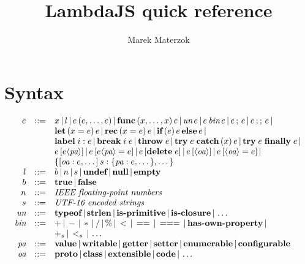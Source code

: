 \documentclass[draft]{article}
\title{LambdaJS quick reference}
\author{Marek Materzok}
\newcommand{\expr}[0]{e}
\newcommand{\var}[0]{x}
\newcommand{\lit}[0]{l}
\newcommand{\bool}[0]{b}
\newcommand{\num}[0]{n}
\newcommand{\str}[0]{s}
\newcommand{\id}[0]{i}
\newcommand{\undef}[0]{\textbf{undef}}
\newcommand{\nul}[0]{\textbf{null}}
\newcommand{\empt}[0]{\textbf{empty}}
\newcommand{\true}[0]{\textbf{true}}
\newcommand{\false}[0]{\textbf{false}}
\newcommand{\unop}[0]{\textit{un}}
\newcommand{\binop}[0]{\textit{bin}}
\newcommand{\pattr}[0]{\textit{pa}}
\newcommand{\oattr}[0]{\textit{oa}}
\newcommand{\pavalue}[0]{\textbf{value}}
\newcommand{\pawritable}[0]{\textbf{writable}}
\newcommand{\paget}[0]{\textbf{getter}}
\newcommand{\paset}[0]{\textbf{setter}}
\newcommand{\paenum}[0]{\textbf{enumerable}}
\newcommand{\paconfig}[0]{\textbf{configurable}}
\newcommand{\oaproto}[0]{\textbf{proto}}
\newcommand{\oaclass}[0]{\textbf{class}}
\newcommand{\oaextens}[0]{\textbf{extensible}}
\newcommand{\oacode}[0]{\textbf{code}}
\newcommand{\unap}[1]{\unop \thinspace #1}
\newcommand{\binap}[2]{#1 \thinspace \binop \thinspace #2}
\newcommand{\ap}[2]{#1\thinspace(#2)}
\newcommand{\func}[2]{\textbf{func}\thinspace(#1)\thinspace #2}
\newcommand{\seq}[2]{#1 \thinspace ; \thinspace #2}
\newcommand{\jseq}[2]{#1 \thinspace ;; \thinspace #2}
\newcommand{\letdef}[3]{\textbf{let} \thinspace (#1 = #2) \thinspace #3}
\newcommand{\recdef}[3]{\textbf{rec} \thinspace (#1 = #2) \thinspace #3}
\newcommand{\ife}[3]{\textbf{if} \thinspace (#1) \thinspace #2 \thinspace \textbf{else} \thinspace #3}
\newcommand{\lbl}[2]{\textbf{label} \thickspace #1: #2}
\newcommand{\brk}[2]{\textbf{break} \thickspace #1 \thickspace #2}
\newcommand{\throw}[1]{\textbf{throw} \thickspace #1}
\newcommand{\trycatch}[3]{\textbf{try} \thickspace #1 \thickspace \textbf{catch}\thinspace(#2) \thinspace #3}
\newcommand{\tryfin}[2]{\textbf{try} \thickspace #1 \thickspace \textbf{finally} \thickspace #2}
\newcommand{\getattr}[3]{#2 \thinspace [ #3 \langle #1 \rangle ] }
\newcommand{\setattr}[4]{#2 \thinspace [ #3 \langle #1 \rangle = #4 ] }
\newcommand{\delattr}[2]{#1 \thinspace [ \textbf{delete} \thickspace #2 ]}
\newcommand{\getoattr}[2]{#2 \thinspace [ \langle #1 \rangle ]}
\newcommand{\setoattr}[3]{#2 \thinspace [ \langle #1 \rangle = #3 ]}
\newcommand{\bnfsep}[0]{\thinspace | \thinspace}
\newcommand{\optypeof}[0]{\textbf{typeof}}
\newcommand{\opstrlen}[0]{\textbf{strlen}}
\newcommand{\opisprim}[0]{\textbf{is-primitive}}
\newcommand{\opisclosure}[0]{\textbf{is-closure}}
\newcommand{\ophasprop}[0]{\textbf{has-own-property}}
\newcommand{\opstrplus}[0]{+_{\str}}
\newcommand{\opstrlt}[0]{<_{\str}}
\begin{document}
\maketitle

\section{Syntax}

\[
\begin{array}{rcl}
\expr & ::= & \var \bnfsep \lit \bnfsep \ap{\expr}{\expr, \dots, \expr} \bnfsep
              \func{\var, \dots, \var}{\expr} \bnfsep
              \unap{\expr} \bnfsep \binap{\expr}{\expr} \bnfsep
              \seq{\expr}{\expr} \bnfsep \jseq{\expr}{\expr} \bnfsep \\
          & & \letdef{\var}{\expr}{\expr} \bnfsep \recdef{\var}{\expr}{\expr} \bnfsep
              \ife{\expr}{\expr}{\expr} \bnfsep \\
          & & \lbl{\id}{\expr} \bnfsep \brk{\id}{\expr} \bnfsep
              \throw{\expr} \bnfsep \trycatch{\expr}{\var}{\expr} \bnfsep \tryfin{\expr}{\expr} \bnfsep \\
          & & \getattr{\pattr}{\expr}{\expr} \bnfsep \setattr{\pattr}{\expr}{\expr}{\expr} \bnfsep
              \delattr{\expr}{\expr} \bnfsep \getoattr{\oattr}{\expr} \bnfsep 
              \setoattr{\oattr}{\expr}{\expr} \bnfsep \\
          & & \{[\oattr: \expr, \dots] \thinspace \str : \{\pattr : \expr, \dots\}, \dots \} \\
\lit & ::= & \bool \bnfsep \num \bnfsep \str \bnfsep \undef \bnfsep \nul \bnfsep \empt \\
\bool & ::= & \true \bnfsep \false \\
\num & ::= & \textit{IEEE floating-point numbers} \\
\str & ::= & \textit{UTF-16 encoded strings} \\
\unop & ::= & \optypeof \bnfsep \opstrlen \bnfsep \opisprim \bnfsep \opisclosure \bnfsep \dots \\
\binop & ::= & + \bnfsep - \bnfsep * \bnfsep / \bnfsep \% \bnfsep < \bnfsep == \bnfsep === \bnfsep 
               \ophasprop \bnfsep \\
           & & \opstrplus \bnfsep \opstrlt \bnfsep \dots \\
\pattr & ::= & \pavalue \bnfsep \pawritable \bnfsep \paget \bnfsep \paset \bnfsep
               \paenum \bnfsep \paconfig \\
\oattr & ::= & \oaproto \bnfsep \oaclass \bnfsep \oaextens \bnfsep \oacode \bnfsep \dots
\end{array}
\]
\end{document}
